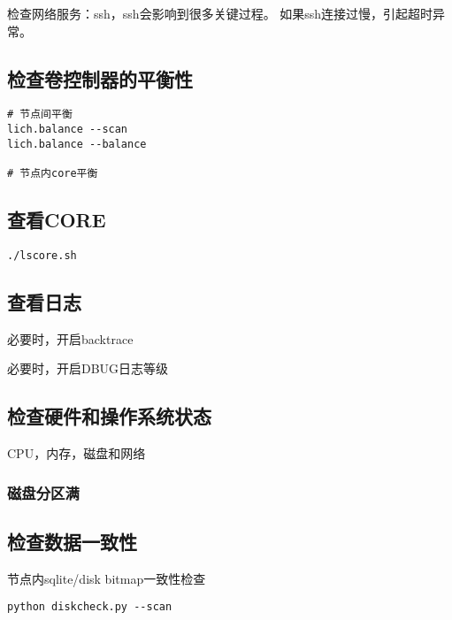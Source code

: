 检查网络服务：ssh，ssh会影响到很多关键过程。
如果ssh连接过慢，引起超时异常。

\subsection{检查卷控制器的平衡性}

\begin{lstlisting}
# 节点间平衡
lich.balance --scan
lich.balance --balance

# 节点内core平衡
\end{lstlisting}

\subsection{查看CORE}

\begin{lstlisting}
./lscore.sh
\end{lstlisting}

\subsection{查看日志}

必要时，开启backtrace

必要时，开启DBUG日志等级

\subsection{检查硬件和操作系统状态}

CPU，内存，磁盘和网络

\subsubsection{磁盘分区满}




\subsection{检查数据一致性}

节点内sqlite/disk bitmap一致性检查

\begin{lstlisting}
python diskcheck.py --scan
\end{lstlisting}

